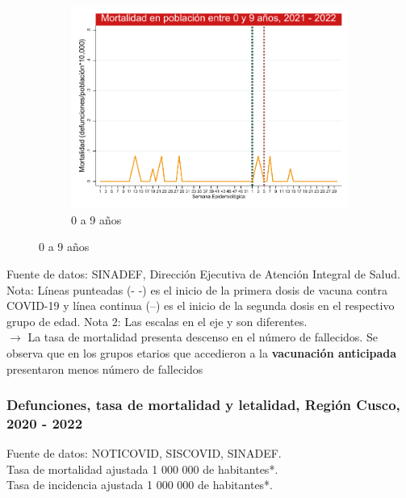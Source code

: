 \documentclass[xcolor=table]{beamer}
\begin{document}
\begin{frame}
\begin{figure}
\begin{subfigure}[b]{0.3\textwidth}
			\includegraphics[width=\textwidth]{../figuras/mortalidad_edad_0.pdf}
			\caption{0 a 9 años}
		\end{subfigure}
		\vspace{10mm}	
	\end{figure}
	\vspace{-.8cm} 
	{\tiny Fuente de datos: SINADEF, Dirección Ejecutiva de Atención Integral de Salud.\\}
	{\tiny Nota: Líneas punteadas (- -) es el inicio de la primera dosis de vacuna contra COVID-19 y línea continua (--) es el inicio de la segunda dosis en el respectivo grupo de edad. Nota 2: Las escalas en el eje y son diferentes.\\}
	$\rightarrow$ {\small La tasa de mortalidad presenta descenso en el número de fallecidos. Se observa que en los grupos etarios que accedieron a la \textbf{\color{mycolor3}vacunación anticipada} presentaron menos número de fallecidos}  \hyperlink{indice}{}
\end{frame}

\begin{frame}
	\frametitle{Defunciones, tasa de mortalidad y letalidad, Región Cusco, 2020 - 2022}
	\vspace{-1.0cm}
	\begin{table}[]
		\resizebox{\textwidth}{!}{%
			
		}
	\end{table}	
	{   \tiny Fuente de datos: NOTICOVID, SISCOVID, SINADEF.\\
		Tasa de mortalidad ajustada 1 000 000 de habitantes*.\\
		Tasa de incidencia ajustada 1 000 000 de habitantes*.\\ 
	}
	
\end{frame}
\end{document}
